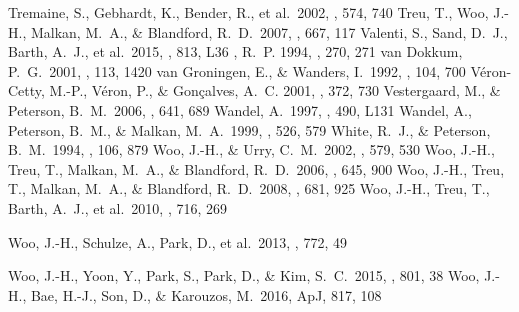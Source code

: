 \documentclass[iop]{emulateapj}
\begin{document}
\begin{thebibliography}{63}
 Tremaine, S., 
Gebhardt, K., Bender, R., et al.\ 2002, \apj, 574, 740 
 Treu, T., Woo, J.-H., 
Malkan, M.~A., \& Blandford, R.~D.\ 2007, \apj, 667, 117 
 Valenti, S., Sand, D.~J., Barth, A.~J., et al.\ 2015, \apjl, 813, L36 
, R.~P. 1994, \mnras, 270, 271
 van Dokkum, P.~G.\ 2001, 
\pasp, 113, 1420
 van Groningen, E., \& Wanders, I.\ 1992, \pasp, 104, 700 
 {V{\'e}ron-Cetty}, M.-P., {V{\'e}ron}, P., \& {Gon{\c c}alves}, A.~C. 2001,  \aap, 372, 730
 Vestergaard, M., \& Peterson, B.~M.\ 2006, \apj, 641, 689 
 Wandel, A.\ 1997, \apjl, 490, L131 
 Wandel, A., Peterson, B.~M., \& Malkan, M.~A.\ 1999, \apj, 526, 579 
 White, R.~J., \& Peterson, B.~M.\ 1994, \pasp, 106, 879 
 Woo, J.-H., \& Urry, C.~M.\ 2002, \apj, 579, 530 
 Woo, J.-H., Treu, T., 
Malkan, M.~A., \& Blandford, R.~D.\ 2006, \apj, 645, 900 
 Woo, J.-H., Treu, T., 
Malkan, M.~A., \& Blandford, R.~D.\ 2008, \apj, 681, 925 
 Woo, J.-H., Treu, T., 
Barth, A.~J., et al.\ 2010, \apj, 716, 269 

 Woo, J.-H., Schulze, A., Park, D., et al.\ 2013, \apj, 772, 49 

 Woo, J.-H., Yoon, Y., Park, S., Park, D., \& Kim, S.~C.\ 2015, \apj, 801, 38 
 Woo, J.-H., Bae, H.-J., 
Son, D., \& Karouzos, M.\ 2016, ApJ, 817, 108


\end{thebibliography}
\end{document}
